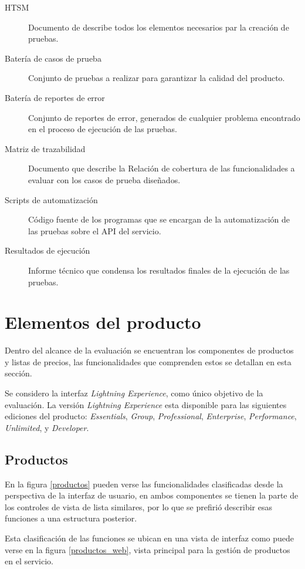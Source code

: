 \begin{description}
\item [HTSM] Documento de describe todos los elementos necesarios par la creación
    de pruebas.
\item [Batería de casos de prueba] Conjunto de pruebas a realizar para garantizar
    la calidad del producto.
\item [Batería de reportes de error] Conjunto de reportes de error, generados de
    cualquier problema encontrado en el proceso de ejecución de las pruebas.
\item [Matriz de trazabilidad] Documento que describe la Relación de cobertura
    de las funcionalidades a evaluar con los casos de prueba diseñados.
\item [Scripts de automatización] Código fuente de los programas que se encargan
    de la automatización de las pruebas sobre el API del servicio.
\item [Resultados de ejecución] Informe técnico que condensa los resultados
    finales de la ejecución de las pruebas.
\end{description}

\section{Elementos del producto}
Dentro del alcance de la evaluación se encuentran los componentes de productos
y listas de precios, las funcionalidades que comprenden estos se detallan en
esta sección.

Se considero la interfaz \emph{Lightning Experience}, como único objetivo de la
evaluación. La versión \emph{Lightning Experience} esta disponible para las
siguientes ediciones del producto: \emph{Essentials}, \emph{Group},
\emph{Professional}, \emph{Enterprise}, \emph{Performance}, \emph{Unlimited}, y
\emph{Developer}.

\subsection{Productos}
En la figura \ref{productos} pueden verse las funcionalidades clasificadas desde
la perspectiva de la interfaz de usuario, en ambos componentes se tienen la
parte de los controles de vista de lista similares, por lo que se prefirió
describir esas funciones a una estructura posterior.

Esta clasificación de las funciones se ubican en una vista de interfaz como
puede verse en la figura \ref{productos_web}, vista principal para la gestión
de productos en el servicio.

